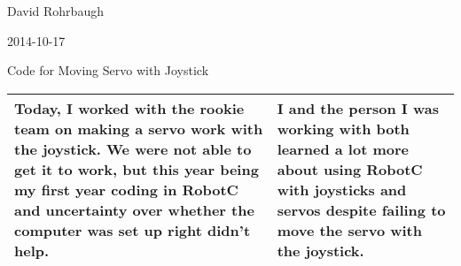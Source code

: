 David Rohrbaugh

2014-10-17

Code for Moving Servo with Joystick

\begin{tabular}{|p{5cm}|p{5cm}|}
 \hline
 Today, I worked with the rookie team on making a servo work with the joystick. We were not able to get it to work, but this year being my first year coding in RobotC and uncertainty over whether the computer was set up right didn't help.
 &
 I and the person I was working with both learned a lot more about using RobotC with joysticks and servos despite failing to move the servo with the joystick.
 \\
 \hline
\end{tabular}
